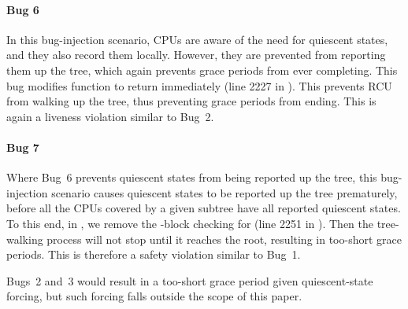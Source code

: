 \paragraph*{Bug 6}
In this bug-injection scenario, CPUs are aware of the need for quiescent
states, and they also record them locally.
However, they are prevented from reporting them up the 
tree, which again prevents grace periods from ever completing.
This bug modifies
function  to return immediately (line 2227 in ). 
This prevents RCU from walking up the  tree, thus preventing grace
periods from ending.
This is again a liveness violation similar to Bug~2.

\paragraph*{Bug 7}
Where Bug~6 prevents quiescent states from being reported up the
 tree, this bug-injection scenario causes quiescent
states to be reported up the tree prematurely, before all the
CPUs covered by a given subtree have all reported quiescent states.
To this end,
in , we remove the -block checking for
 (line 2251 in ). 
Then the tree-walking process will not stop until it reaches the root, resulting in 
too-short grace periods.
This is therefore a safety violation similar to Bug~1.

\noindent Bugs~2 and~3 would result in a too-short grace period given quiescent-state forcing, 
but such forcing falls outside the scope of this paper.
